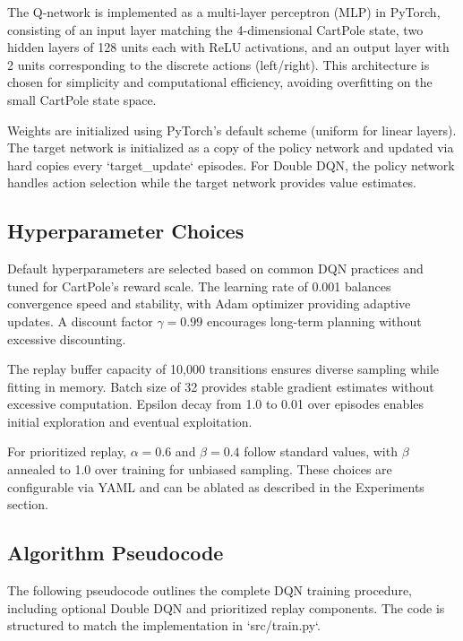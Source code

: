 \documentclass{IEEEtran}
\begin{document}
The Q-network is implemented as a multi-layer perceptron (MLP) in PyTorch, consisting of an input layer matching the 4-dimensional CartPole state, two hidden layers of 128 units each with ReLU activations, and an output layer with 2 units corresponding to the discrete actions (left/right). This architecture is chosen for simplicity and computational efficiency, avoiding overfitting on the small CartPole state space.

Weights are initialized using PyTorch's default scheme (uniform for linear layers). The target network is initialized as a copy of the policy network and updated via hard copies every `target_update` episodes. For Double DQN, the policy network handles action selection while the target network provides value estimates.

\subsection{Hyperparameter Choices}

Default hyperparameters are selected based on common DQN practices and tuned for CartPole's reward scale. The learning rate of 0.001 balances convergence speed and stability, with Adam optimizer providing adaptive updates. A discount factor $\gamma = 0.99$ encourages long-term planning without excessive discounting.

The replay buffer capacity of 10,000 transitions ensures diverse sampling while fitting in memory. Batch size of 32 provides stable gradient estimates without excessive computation. Epsilon decay from 1.0 to 0.01 over episodes enables initial exploration and eventual exploitation.

For prioritized replay, $\alpha = 0.6$ and $\beta = 0.4$ follow standard values, with $\beta$ annealed to 1.0 over training for unbiased sampling. These choices are configurable via YAML and can be ablated as described in the Experiments section.

\subsection{Algorithm Pseudocode}

The following pseudocode outlines the complete DQN training procedure, including optional Double DQN and prioritized replay components. The code is structured to match the implementation in `src/train.py`.
\end{document}

